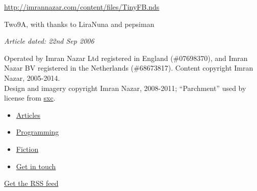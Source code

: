 \documentclass[11pt,a4paper]{article}
\begin{document}
\url{http://imrannazar.com/content/files/TinyFB.nds}

Two9A, with thanks to LiraNuna and pepsiman

\emph{Article dated: 22nd Sep 2006}

\hypertarget{foot}{}
Operated by Imran Nazar Ltd registered in England (\#07698370), and
Imran Nazar BV registered in the Netherlands (\#68673817). Content
copyright Imran Nazar, 2005-2014.\\
Design and imagery copyright Imran Nazar, 2008-2011; ``Parchment'' used
by license from \href{http://sxc.hu/}{sxc}.

\begin{itemize}
\item
  \hypertarget{nav_Articles}{}

  \href{http://imrannazar.com/Articles}{Articles}
\item
  \hypertarget{nav_Programming}{}

  \href{http://imrannazar.com/Programming}{Programming}
\item
  \hypertarget{nav_Fiction}{}

  \href{http://imrannazar.com/Fiction}{Fiction}
\item
  \hypertarget{nav_Contact}{}

  \href{http://imrannazar.com/Contact}{Get in touch}
\end{itemize}

\href{http://imrannazar.com/rss.xml}{Get the RSS feed}

\hypertarget{ads}{}
\end{document}
